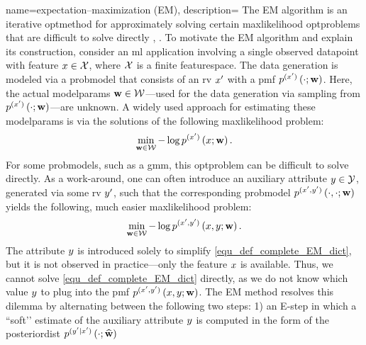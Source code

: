 {name={expectation–maximization (EM)}, 
	description={
	    	The EM \gls{algorithm} \cite{dempster1977maximum} is an iterative \gls{optmethod} for 
		approximately solving certain \gls{maxlikelihood} \glspl{optproblem} 
		that are difficult to solve directly \cite[Sec. 9.4]{BishopBook}, \cite[Sec. 11.4.7]{Murphy2012}.
	    	To motivate the EM \gls{algorithm} and explain its construction, 
		consider an \gls{ml} application involving a single observed \gls{datapoint} 
		with \gls{feature} $x \in \mathcal{X}$, where $\mathcal{X}$ 
		is a finite \gls{featurespace}. The \gls{data} generation 
		is modeled via a \gls{probmodel} that consists of an \gls{rv} $x'$ 
		with a \gls{pmf} $p^{(x')}\left(\cdot;{\bf w}\right)$. Here, 
		the actual \glspl{modelparam} ${\bf w} \in \mathcal{W}$—used for the \gls{data} 
		generation via sampling from $p^{(x')}\left(\cdot;{\bf w}\right)$—are unknown. A widely 
		used approach for estimating these \glspl{modelparam} is via the solutions of the following 
		\gls{maxlikelihood} problem:
		\begin{equation}
			\label{equ_def_ML_EM_dict}
			\min_{{\bf w} \in \mathcal{W}} - \log p^{(x')}\left(x;{\bf w}\right).
		\end{equation}
		For some \glspl{probmodel}, such as a \gls{gmm}, this \gls{optproblem} can be 
		difficult to solve directly. As a work-around, one can often introduce an auxiliary 
		attribute $y \in \mathcal{Y}$, generated via some \gls{rv} $y'$, 
		such that the corresponding \gls{probmodel} $p^{(x',y')}\left(\cdot,\cdot;{\bf w}\right)$ 
		yields the following, much easier \gls{maxlikelihood} problem:
		\begin{equation}
			\label{equ_def_complete_EM_dict}
			\min_{{\bf w} \in \mathcal{W}} 
			- \log p^{(x',y')}\left(x,y;{\bf w}\right).
		\end{equation}
		The attribute $y$ is introduced solely to simplify 
		\eqref{equ_def_complete_EM_dict}, but it is not observed in practice—only the 
		\gls{feature} $x$ is available. Thus, we cannot solve \eqref{equ_def_complete_EM_dict} 
		directly, as we do not know which value $y$ to plug into the \gls{pmf} 
		$ p^{(x',y')}\left(x,y;{\bf w}\right)$. 
		The EM method resolves this dilemma by alternating between the following two steps:
		1) an E-step in which a “soft’’ estimate of the auxiliary attribute $y$ is computed 
		in the form of the \gls{posteriordist} $p^{(y'|x')}\left(\cdot;\widehat{{\bf w}}\right)$
}}
